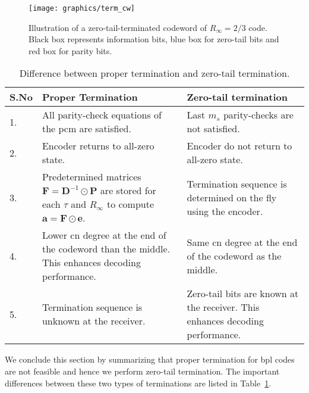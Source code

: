 \begin{figure}[htbp]
  \centering
  \texttt{[image: graphics/term\_cw]}
  \caption{Illustration of a zero-tail-terminated codeword of $R_\infty=2/3$ code. Black box represents information bits, blue box for zero-tail bits and red box for parity bits.}
  \label{fig:term_cw}
\end{figure}

\begin{table}[htbp]
  \centering
  \begin{tabular}{|l|p{7cm}|p{7cm}|}
    \hline
    \textbf{S.No} &\textbf{Proper Termination} &\textbf{Zero-tail termination}\\
    \hline
    \hline
    1. &All parity-check equations of the \ac{pcm} are satisfied. &Last $m_s$ parity-checks are not satisfied.\\
    \hline
    2. &Encoder returns to all-zero state. &Encoder do not return to all-zero state.\\
    \hline
    3. &Predetermined matrices $\mathbf{F}=\mathbf{D}^{-1}\odot\mathbf{P}$ are stored for each $\tau$ and $R_\infty$ to compute $\mathbf{a}=\mathbf{F}\odot\mathbf{e}$. &Termination sequence is determined on the fly using the encoder.\\
    \hline
    4. &Lower \ac{cn} degree at the end of the codeword than the middle. This enhances decoding performance. &Same \ac{cn} degree at the end of the codeword as the middle.\\
    \hline
    5. &Termination sequence is unknown at the receiver. &Zero-tail bits are known at the receiver. This enhances decoding performance.\\
    \hline
  \end{tabular}
  \caption{Difference between proper termination and zero-tail termination.}
  \label{tab:diff_term}
\end{table}

We conclude this section by summarizing that proper termination for \ac{bpl} codes are not feasible and hence we perform zero-tail termination. The important differences between these two types of terminations are listed in Table~\ref{tab:diff_term}.